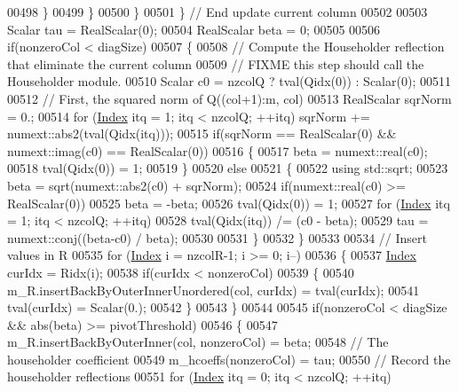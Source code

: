 \begin{DoxyCode}
00498           \}
00499         \}
00500       \}
00501     \} \textcolor{comment}{// End update current column}
00502     
00503     Scalar tau = RealScalar(0);
00504     RealScalar beta = 0;
00505     
00506     \textcolor{keywordflow}{if}(nonzeroCol < diagSize)
00507     \{
00508       \textcolor{comment}{// Compute the Householder reflection that eliminate the current column}
00509       \textcolor{comment}{// FIXME this step should call the Householder module.}
00510       Scalar c0 = nzcolQ ? tval(Qidx(0)) : Scalar(0);
00511       
00512       \textcolor{comment}{// First, the squared norm of Q((col+1):m, col)}
00513       RealScalar sqrNorm = 0.;
00514       \textcolor{keywordflow}{for} (\hyperlink{namespace_eigen_a62e77e0933482dafde8fe197d9a2cfde}{Index} itq = 1; itq < nzcolQ; ++itq) sqrNorm += numext::abs2(tval(Qidx(itq)));
00515       \textcolor{keywordflow}{if}(sqrNorm == RealScalar(0) && numext::imag(c0) == RealScalar(0))
00516       \{
00517         beta = numext::real(c0);
00518         tval(Qidx(0)) = 1;
00519       \}
00520       \textcolor{keywordflow}{else}
00521       \{
00522         \textcolor{keyword}{using} std::sqrt;
00523         beta = sqrt(numext::abs2(c0) + sqrNorm);
00524         \textcolor{keywordflow}{if}(numext::real(c0) >= RealScalar(0))
00525           beta = -beta;
00526         tval(Qidx(0)) = 1;
00527         \textcolor{keywordflow}{for} (\hyperlink{namespace_eigen_a62e77e0933482dafde8fe197d9a2cfde}{Index} itq = 1; itq < nzcolQ; ++itq)
00528           tval(Qidx(itq)) /= (c0 - beta);
00529         tau = numext::conj((beta-c0) / beta);
00530           
00531       \}
00532     \}
00533 
00534     \textcolor{comment}{// Insert values in R}
00535     \textcolor{keywordflow}{for} (\hyperlink{namespace_eigen_a62e77e0933482dafde8fe197d9a2cfde}{Index}  i = nzcolR-1; i >= 0; i--)
00536     \{
00537       \hyperlink{namespace_eigen_a62e77e0933482dafde8fe197d9a2cfde}{Index} curIdx = Ridx(i);
00538       \textcolor{keywordflow}{if}(curIdx < nonzeroCol) 
00539       \{
00540         m\_R.insertBackByOuterInnerUnordered(col, curIdx) = tval(curIdx);
00541         tval(curIdx) = Scalar(0.);
00542       \}
00543     \}
00544 
00545     \textcolor{keywordflow}{if}(nonzeroCol < diagSize && abs(beta) >= pivotThreshold)
00546     \{
00547       m\_R.insertBackByOuterInner(col, nonzeroCol) = beta;
00548       \textcolor{comment}{// The householder coefficient}
00549       m\_hcoeffs(nonzeroCol) = tau;
00550       \textcolor{comment}{// Record the householder reflections}
00551       \textcolor{keywordflow}{for} (\hyperlink{namespace_eigen_a62e77e0933482dafde8fe197d9a2cfde}{Index} itq = 0; itq < nzcolQ; ++itq)

\end{DoxyCode}
